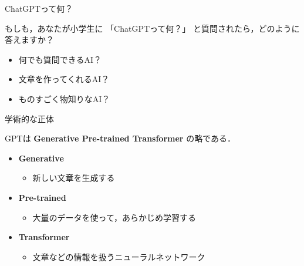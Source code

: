 \documentclass[aspectratio=169,professionalfonts]{beamer}
\begin{document}
\begin{frame}{ChatGPTって何？}

  もしも，あなたが小学生に
  「ChatGPTって何？」
  と質問されたら，どのように答えますか？

  \vspace{1em}

  \begin{itemize}
    \item 何でも質問できるAI？
    \item 文章を作ってくれるAI？
    \item ものすごく物知りなAI？
  \end{itemize}


\end{frame}


\begin{frame}{学術的な正体}

  GPTは
  \textbf{Generative Pre-trained Transformer}
  の略である．

  \vspace{1em}

  \begin{itemize}
    \item \textbf{Generative}
      \begin{itemize}
        \item 新しい文章を生成する
      \end{itemize}

    \item \textbf{Pre-trained}
      \begin{itemize}
        \item 大量のデータを使って，あらかじめ学習する
      \end{itemize}

    \item \textbf{Transformer}
      \begin{itemize}
        \item 文章などの情報を扱うニューラルネットワーク
      \end{itemize}
  \end{itemize}


\end{frame}
\end{document}
